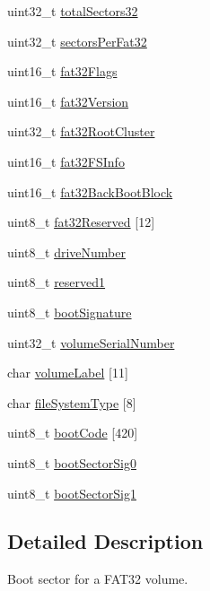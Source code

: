 \begin{DoxyCompactItemize}
\item 
uint32\-\_\-t \hyperlink{structfat32__boot_a64d5902f9e900ecc745b1c0b325d875f}{total\-Sectors32}
\item 
uint32\-\_\-t \hyperlink{structfat32__boot_a687653b3b71ab0de1f27f8ab8f331a1c}{sectors\-Per\-Fat32}
\item 
uint16\-\_\-t \hyperlink{structfat32__boot_a4f864cefb7f1b004d5739ffab9a65ae1}{fat32\-Flags}
\item 
uint16\-\_\-t \hyperlink{structfat32__boot_a8f27235fa3dee48a4b4e099135fc81d6}{fat32\-Version}
\item 
uint32\-\_\-t \hyperlink{structfat32__boot_a58249ed4ed0f92d5768f2342f248af82}{fat32\-Root\-Cluster}
\item 
uint16\-\_\-t \hyperlink{structfat32__boot_aad3222ea255af06d09734e96a93c82ed}{fat32\-F\-S\-Info}
\item 
uint16\-\_\-t \hyperlink{structfat32__boot_a1914baf34756efd18072059dccfcf40f}{fat32\-Back\-Boot\-Block}
\item 
uint8\-\_\-t \hyperlink{structfat32__boot_ae31dc7ad96aec8e0d184fd7e5a97f30d}{fat32\-Reserved} \mbox{[}12\mbox{]}
\item 
uint8\-\_\-t \hyperlink{structfat32__boot_aa7c65fdb4f759fca094105d1c870bcb2}{drive\-Number}
\item 
uint8\-\_\-t \hyperlink{structfat32__boot_a2a2556147677ece60b8aadf4a0d608ed}{reserved1}
\item 
uint8\-\_\-t \hyperlink{structfat32__boot_acc4a4e4c22b630d12c1b2c2b8c7eb366}{boot\-Signature}
\item 
uint32\-\_\-t \hyperlink{structfat32__boot_a7c9ffcee12051cefe1724e8024af25f8}{volume\-Serial\-Number}
\item 
char \hyperlink{structfat32__boot_a253960050a38d2bfb2f57e86769aca62}{volume\-Label} \mbox{[}11\mbox{]}
\item 
char \hyperlink{structfat32__boot_adf80bb044ef7c8ac6d371268aa338e23}{file\-System\-Type} \mbox{[}8\mbox{]}
\item 
uint8\-\_\-t \hyperlink{structfat32__boot_a5d683c906867f4e0122d2ce3462de292}{boot\-Code} \mbox{[}420\mbox{]}
\item 
uint8\-\_\-t \hyperlink{structfat32__boot_abdaf2cc75b74800944ede557442ca5bd}{boot\-Sector\-Sig0}
\item 
uint8\-\_\-t \hyperlink{structfat32__boot_a44983e94ecddbdcb7ab691e493a13d94}{boot\-Sector\-Sig1}
\end{DoxyCompactItemize}


\subsection{Detailed Description}
Boot sector for a F\-A\-T32 volume. 

